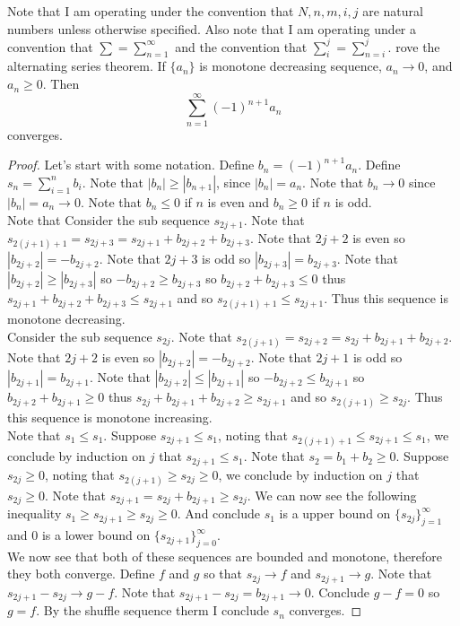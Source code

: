 \documentclass[12pt]{article}
\makeatletter
\theoremstyle{homework}
\newenvironment{exercise}[1]
{\def\@currentlabel{#1}\exercisecore}
{\endexercisecore}
\makeatother
\begin{document}
Note that I am operating under the convention that $N,n,m,i,j$ are natural numbers unless otherwise specified.  Also note that I am operating under a convention that $\sum=\sum_{n=1}^\infty$ and the convention that $\sum_i^j=\sum_{n=i}^j$.
\begin{exercise}

Prove the alternating series theorem.  If $\{a_n\}$ is monotone decreasing sequence, $a_n\rightarrow 0$, and $a_n\geq 0$.  Then 
$$\sum_{n=1}^{\infty}(-1)^{n+1}a_n$$
converges.
\end{exercise}
\begin{proof}
Let's start with some notation.  Define $b_n=(-1)^{n+1}a_n$.  Define $s_n=\sum_{i=1}^{n}b_i$.  Note that $|b_n|\geq|b_{n+1}|$, since $|b_n|=a_n$.  Note that $b_n\rightarrow 0$ since $|b_n|=a_n\rightarrow 0$.  Note that $b_n\leq 0$ if $n$ is even and $b_n\geq 0$ if $n$ is odd.\\
Note that
Consider the sub sequence $s_{2j+1}$.  Note that $s_{2(j+1)+1}=s_{2j+3}=s_{2j+1}+b_{2j+2}+b_{2j+3}$.  Note that $2j+2$ is even so $|b_{2j+2}|=-b_{2j+2}$.  Note that $2j+3$ is odd so $|b_{2j+3}|=b_{2j+3}$.  Note that $|b_{2j+2}|\geq|b_{2j+3}|$ so $-b_{2j+2}\geq b_{2j+3}$ so $b_{2j+2}+b_{2j+3}\leq 0$ thus $s_{2j+1}+b_{2j+2}+b_{2j+3}\leq s_{2j+1}$ and so $s_{2(j+1)+1}\leq s_{2j+1}$.  Thus this sequence is monotone decreasing.\\
Consider the sub sequence $s_{2j}$.  Note that $s_{2(j+1)}=s_{2j+2}=s_{2j}+b_{2j+1}+b_{2j+2}$.  Note that $2j+2$ is even so $|b_{2j+2}|=-b_{2j+2}$.  Note that $2j+1$ is odd so $|b_{2j+1}|=b_{2j+1}$.  Note that $|b_{2j+2}|\leq|b_{2j+1}|$ so $-b_{2j+2}\leq b_{2j+1}$ so $b_{2j+2}+b_{2j+1}\geq 0$ thus $s_{2j}+b_{2j+1}+b_{2j+2}\geq s_{2j+1}$ and so $s_{2(j+1)}\geq s_{2j}$.  Thus this sequence is monotone increasing.\\
Note that $s_{1}\leq s_{1}$.  Suppose $s_{2j+1}\leq s_{1}$, noting that $s_{2(j+1)+1}\leq s_{2j+1}\leq s_1$, we conclude by induction on $j$ that $s_{2j+1}\leq s_1$.  Note that $s_{2}=b_1+b_2\geq 0$.  Suppose $s_{2j}\geq 0$, noting that $s_{2(j+1)}\geq s_{2j}\geq 0$, we conclude by induction on $j$ that $s_{2j}\geq 0$.  Note that $s_{2j+1}=s_{2j}+b_{2j+1}\geq s_{2j}$.  We can now see the following inequality $s_{1}\geq s_{2j+1}\geq s_{2j}\geq 0$.  And conclude $s_1$ is a upper bound on $\{s_{2j}\}^{\infty}_{j=1}$ and $0$ is a lower bound on $\{s_{2j+1}\}^{\infty}_{j=0}$.\\
We now see that both of these sequences are bounded and monotone, therefore they both converge.  Define $f$ and $g$ so that $s_{2j}\rightarrow f$ and $s_{2j+1}\rightarrow g$.  Note that $s_{2j+1}-s_{2j}\rightarrow g-f$.  Note that $s_{2j+1}-s_{2j}=b_{2j+1}\rightarrow 0$.  Conclude $g-f=0$ so $g=f$.  By the shuffle sequence therm I conclude $s_n$ converges.
\end{proof}
\end{document}
